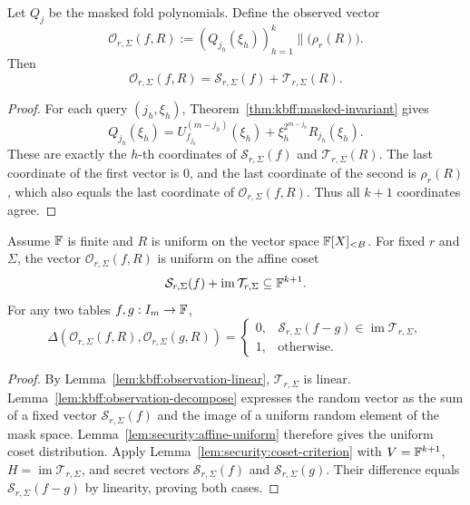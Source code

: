 \begin{lemma}\label{lem:kbff:observation-decompose}
Let $Q_j$ be the masked fold polynomials. Define the observed vector
\[
 \mathcal O_{r,\Sigma}(f,R)
 :=\left(Q_{j_h}(\xi_h)\right)_{h=1}^k
     \mathbin{\|}\bigl(\rho_r(R)\bigr).
\]
Then
\[
 \boxed{
 \mathcal O_{r,\Sigma}(f,R)
  =\mathcal S_{r,\Sigma}(f)+\mathcal T_{r,\Sigma}(R).
 }
\]
\end{lemma}
\begin{proof}
For each query $(j_h,\xi_h)$, Theorem~\ref{thm:kbff:masked-invariant}
gives
\[
 Q_{j_h}(\xi_h)
 =U_{f_{j_h}}^{(m-j_h)}(\xi_h)
   +\xi_h^{2^{m-j_h}}R_{j_h}(\xi_h).
\]
These are exactly the $h$-th coordinates of
$\mathcal S_{r,\Sigma}(f)$ and $\mathcal T_{r,\Sigma}(R)$.
The last coordinate of the first vector is $0$, and the last
coordinate of the second is $\rho_r(R)$, which also equals the
last coordinate of $\mathcal O_{r,\Sigma}(f,R)$.
Thus all $k+1$ coordinates agree.
\end{proof}

\begin{theorem}\label{thm:kbff:joint-mask}
Assume $\mathbb{F}$ is finite and $R$ is uniform on the vector space
$\mathbb{F}[X]_{<B}$. For fixed $r$ and $\Sigma$, the vector
$\mathcal O_{r,\Sigma}(f,R)$ is uniform on the affine coset
\[
 \mathcal S_{r,\Sigma}(f)
   +\operatorname{im}\mathcal T_{r,\Sigma}
 \subseteq\mathbb{F}^{k+1}.
\]
For any two tables $f,g:I_m\to\mathbb{F}$,
\[
 \boxed{
 \Delta\left(
 \mathcal O_{r,\Sigma}(f,R),\mathcal O_{r,\Sigma}(g,R)
 \right)
 =
 \begin{cases}
 0,&\mathcal S_{r,\Sigma}(f-g)
        \in\operatorname{im}\mathcal T_{r,\Sigma},\\
 1,&\text{otherwise}.
 \end{cases}}
\]
\end{theorem}
\begin{proof}
By Lemma~\ref{lem:kbff:observation-linear},
$\mathcal T_{r,\Sigma}$ is linear. Lemma~\ref{lem:kbff:observation-decompose}
expresses the random vector as the sum of a fixed vector
$\mathcal S_{r,\Sigma}(f)$ and the image of a uniform random
element of the mask space. Lemma~\ref{lem:security:affine-uniform}
therefore gives the uniform coset distribution.
Apply Lemma~\ref{lem:security:coset-criterion} with
$V=\mathbb{F}^{k+1}$, $H=\operatorname{im}\mathcal T_{r,\Sigma}$,
and secret vectors $\mathcal S_{r,\Sigma}(f)$ and
$\mathcal S_{r,\Sigma}(g)$. Their difference equals
$\mathcal S_{r,\Sigma}(f-g)$ by linearity, proving both cases.
\end{proof}


